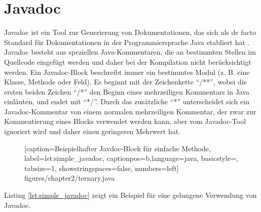 \section{Javadoc}\label{chapter:javadoc}
Javadoc \cite{HowtoWriteDocCommentsfortheJavadocTool} ist ein Tool zur Generierung von Dokumentationen, das sich als de facto Standard für Dokumentationen in der Programmiersprache Java etabliert hat \cite[S. 249]{JavadocViolationsandTheirEvolutioninOpen-SourceSoftware}.  Javadoc besteht aus speziellen Java-Kommentaren, die an bestimmten Stellen im Quellcode eingefügt werden und daher bei der Kompilation nicht berücksichtigt werden. Ein Javadoc-Block beschreibt immer ein bestimmtes Modul (z. B. eine Klasse, Methode oder Feld). Es beginnt mit der Zeichenkette \enquote{/**}, wobei die ersten beiden Zeichen \enquote{/*} den Beginn eines mehrzeiligen Kommentars in Java einläuten, und endet mit \enquote{*/}. Durch das zusätzliche \enquote{*} unterscheidet sich ein Javadoc-Kommentar von einem normalen mehrzeiligen Kommentar, der zwar zur Kommentierung eines Blocks verwendet werden kann, aber vom Javadoc-Tool ignoriert wird und daher einen geringeren Mehrwert hat. 


		\begin{figure}[ht!]
			
			[caption={Beispielhafter Javdoc-Block für einfache Methode},
			label={lst:simple_javadoc},
			captionpos=b,language=java, basicstyle=\footnotesize, tabsize=1, showstringspaces=false,  numbers=left]
			{figures/chapter2/ternary.java}
		\end{figure}

Listing \ref{lst:simple_javadoc} zeigt ein Beispiel für eine gelungene Verwendung von Javadoc.

		
		
